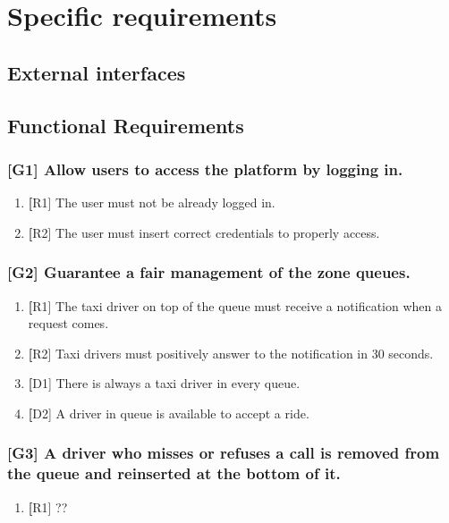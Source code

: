 \section{Specific requirements}

\subsection{External interfaces}


\subsection{Functional Requirements}
\subsubsection{[G1] Allow users to access the platform by logging in.}
	\begin{enumerate}
	\item \textbf [R1] The user must not be already logged in.
	\item \textbf [R2] The user must insert correct credentials to properly access.
	\end{enumerate}

\subsubsection{[G2] Guarantee a fair management of the zone queues.}
	\begin{enumerate}
	\item \textbf [R1] The taxi driver on top of the queue must receive a notification when a request comes.
	\item \textbf [R2] Taxi drivers must positively answer to the notification in 30 seconds.
	\item \textbf [D1] There is always a taxi driver in every queue.
	\item \textbf [D2] A driver in queue is available to accept a ride.
	\end{enumerate}

\subsubsection{[G3] A driver who misses or refuses a call is removed from the queue and reinserted at the bottom of it.}
	\begin{enumerate}
	\item \textbf [R1] ??
	\end{enumerate}
	
